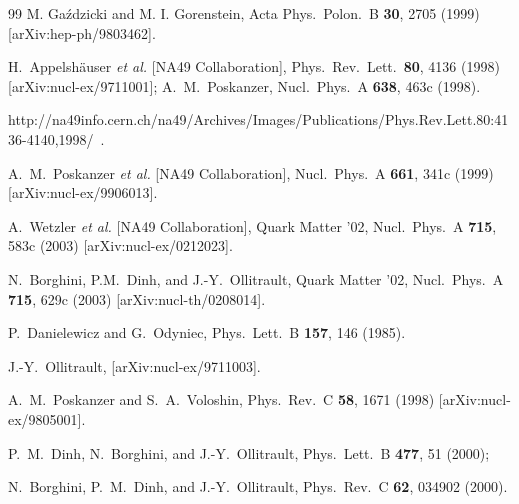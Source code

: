 \documentclass[aps,prc,superscriptaddress,showpacs,floatfix,nofootinbib]{revtex4}
\begin{document}
\begin{thebibliography}{99}
M. Ga\'zdzicki and M. I. Gorenstein,
Acta Phys.\ Polon.\ B {\bf 30}, 2705 (1999)
[arXiv:hep-ph/9803462].

H.~Appelsh{\"a}user {\it et al.}  [NA49 Collaboration],
Phys.\ Rev.\ Lett.\  {\bf 80}, 4136 (1998)
[arXiv:nucl-ex/9711001]; 
A.~M.~Poskanzer, 
Nucl.\ Phys.\ A {\bf 638}, 463c (1998).

http://na49info.cern.ch/na49/Archives/Images/Publications/Phys.Rev.Lett.80:4136-4140,1998/~. 

A.~M.~Poskanzer {\it et al.}  [NA49 Collaboration],
Nucl.\ Phys.\ A {\bf 661}, 341c (1999)
[arXiv:nucl-ex/9906013].

A.~Wetzler {\it et al.}  [NA49 Collaboration],
Quark Matter '02, Nucl.\ Phys.\ A {\bf 715}, 583c (2003) 
[arXiv:nucl-ex/0212023].

N.~Borghini, P.M.~Dinh, and J.-Y.~Ollitrault,
Quark Matter '02, Nucl.\ Phys.\ A {\bf 715}, 629c (2003) 
[arXiv:nucl-th/0208014].

P.~Danielewicz and G.~Odyniec,
Phys.\ Lett.\ B {\bf 157}, 146 (1985).

J.-Y.~Ollitrault,
[arXiv:nucl-ex/9711003].

A.~M.~Poskanzer and S.~A.~Voloshin,
Phys.\ Rev.\ C {\bf 58}, 1671 (1998)
[arXiv:nucl-ex/9805001].

P.~M.~Dinh, N.~Borghini, and J.-Y.~Ollitrault,
Phys.\ Lett.\ B {\bf 477}, 51 (2000);

N.~Borghini, P.~M.~Dinh, and J.-Y.~Ollitrault,
Phys.\ Rev.\ C {\bf 62}, 034902 (2000).


\end{thebibliography}
\end{document}
